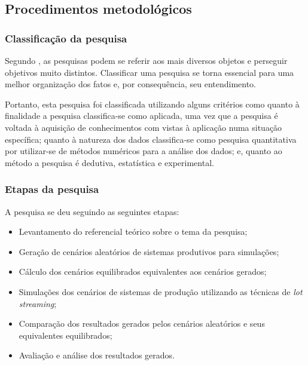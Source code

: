 \subsection{Procedimentos metodológicos} \label{subsec:metod}
    \subsubsection{Classificação da pesquisa}
    Segundo , as pesquisas podem se referir aos mais diversos objetos e perseguir objetivos muito distintos. Classificar uma pesquisa se torna essencial para uma melhor organização dos fatos e, por consequência, seu entendimento.
    
    Portanto, esta pesquisa foi classificada utilizando alguns critérios como quanto à finalidade a pesquisa classifica-se como aplicada, uma vez que a pesquisa é voltada à aquisição de conhecimentos com vistas à aplicação numa situação específica; quanto à natureza dos dados classifica-se como pesquisa quantitativa por utilizar-se de métodos numéricos para a análise dos dados; e, quanto ao método a pesquisa é dedutiva, estatística e experimental.
    
    \subsubsection{Etapas da pesquisa}
    A pesquisa se deu seguindo as seguintes etapas:
    \begin{itemize}
        \item Levantamento do referencial teórico sobre o tema da pesquisa;
        \item Geração de cenários aleatórios de sistemas produtivos para simulações;
        \item Cálculo dos cenários equilibrados equivalentes aos cenários gerados;
        \item Simulações dos cenários de sistemas de produção utilizando as técnicas de \textit{lot streaming};
        \item Comparação dos resultados gerados pelos cenários aleatórios e seus equivalentes equilibrados;
        \item Avaliação e análise dos resultados gerados.
    \end{itemize}
    